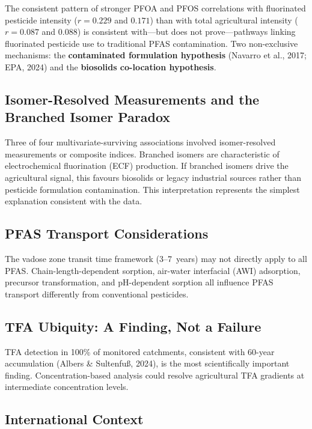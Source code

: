 \documentclass[12pt,a4paper]{article}
\begin{document}
The consistent pattern of stronger PFOA and PFOS correlations with fluorinated pesticide intensity ($r = 0.229$ and $0.171$) than with total agricultural intensity ($r = 0.087$ and $0.088$) is consistent with---but does not prove---pathways linking fluorinated pesticide use to traditional PFAS contamination. Two non-exclusive mechanisms: the \textbf{contaminated formulation hypothesis} (Navarro et al., 2017; EPA, 2024) and the \textbf{biosolids co-location hypothesis}.

\subsection{Isomer-Resolved Measurements and the Branched Isomer Paradox}

Three of four multivariate-surviving associations involved isomer-resolved measurements or composite indices. Branched isomers are characteristic of electrochemical fluorination (ECF) production. If branched isomers drive the agricultural signal, this favours biosolids or legacy industrial sources rather than pesticide formulation contamination. This interpretation represents the simplest explanation consistent with the data.

\subsection{PFAS Transport Considerations}

The vadose zone transit time framework (3--7~years) may not directly apply to all PFAS. Chain-length-dependent sorption, air-water interfacial (AWI) adsorption, precursor transformation, and pH-dependent sorption all influence PFAS transport differently from conventional pesticides.

\subsection{TFA Ubiquity: A Finding, Not a Failure}

TFA detection in 100\% of monitored catchments, consistent with 60-year accumulation (Albers \& Sultenfu\ss, 2024), is the most scientifically important finding. Concentration-based analysis could resolve agricultural TFA gradients at intermediate concentration levels.

\subsection{International Context}
\end{document}
